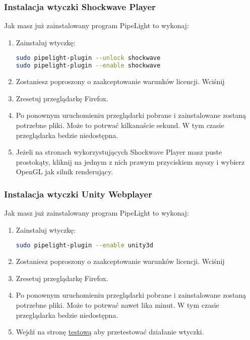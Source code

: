 \subsubsection{Instalacja wtyczki Shockwave Player}
\noindent Jak masz już zainstalowany program PipeLight to wykonaj:
\begin{enumerate}
\item Zainstaluj wtyczkę:
\begin{lstlisting}[language=bash]
sudo pipelight-plugin --unlock shockwave
sudo pipelight-plugin --enable shockwave
\end{lstlisting}
\item Zostaniesz poproszony o zaakceptowanie warunków licencji. Wciśnij 
\item Zresetuj przeglądarkę Firefox.
\item Po ponownym uruchomieniu przeglądarki pobrane i zainstalowane zostaną potrzebne pliki. Może to potrwać kilkanaście sekund. W tym czasie przeglądarka bedzie niedostępna.
\item Jeżeli na stronach wykorzystujących Shockwave Player masz puste prostokąty, kliknij na jednym z nich prawym przyciskiem myszy i wybierz \textcolor{ubuntu_orange}{OpenGL} jak silnik renderujący.
\end{enumerate}

\subsubsection{Instalacja wtyczki Unity Webplayer}
\noindent Jak masz już zainstalowany program PipeLight to wykonaj:
\begin{enumerate}
\item Zainstaluj wtyczkę:
\begin{lstlisting}[language=bash]
sudo pipelight-plugin --enable unity3d
\end{lstlisting}
\item Zostaniesz poproszony o zaakceptowanie warunków licencji. Wciśnij 
\item Zresetuj przeglądarkę Firefox.
\item Po ponownym uruchomieniu przeglądarki pobrane i zainstalowane zostaną potrzebne pliki. Może to potrwać nawet lika minut. W tym czasie przeglądarka bedzie niedostępna.
\item Wejdź na stronę \href{https://unity3d.com/showcase/live-demos}{testową} aby przetestować działanie wtyczki.
\end{enumerate}

